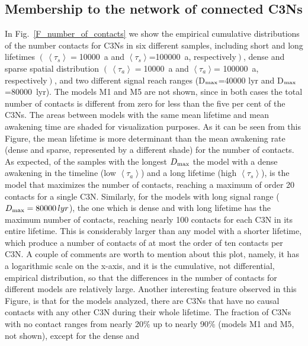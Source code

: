 \documentclass[crop]{CSLB}
\newcommand{\ceti}{C3N}
\newcommand{\cetis}{C3Ns}
\newcommand{\ffn}[1]{}
\begin{document}


\subsection{Membership to the network of connected \cetis{}}\label{SS_members}

\ffn{3}
%
In Fig.~\ref{F_number_of_contacts} we show the empirical cumulative
distributions of the number contacts for \cetis{} in six different
samples, including short and long lifetimes
$\left(\,\left<\tau_s\right>=\right.$10000~a and
$\left<\tau_s\right>$=100000~a, respectively$\left.\right)$, dense
and sparse spatial distribution
$\left(\,\left<\tau_a\right>=\right.$10000~a and
$\left<\tau_a\right>$= 100000~a, respectively$\left.\right)$, and two
different signal reach ranges (D$_{\rm max}$=40000 lyr and
D$_{\rm max}$=80000~lyr).
%
The models M1 and M5 are not shown, since in both cases the total
number of contacts is different from zero for less than the five per
cent of the \cetis{}.
%
The areas between models with the same mean lifetime and mean
awakening time are shaded for visualization purposes.
%
As it can be seen from this Figure, the mean lifetime is more
determinant than the mean awakening rate (dense and sparse,
represented by a different shade) for the number of contacts.
%
As expected, of the samples with the longest $D_{\rm max}$ the model with
a dense awakening in the timeline (low $\left<\tau_a\right>$) and a
long lifetime (high $\left<\tau_s\right>$), is the model that
maximizes the number of contacts, reaching a maximum of order 20
contacts for a single \ceti{}.
%
Similarly, for the models with long signal range
($D_{\rm max}=80000\,lyr$), the one which is dense and with long lifetime
has the maximum number of contacts, reaching nearly 100 contacts for
each \ceti{} in its entire lifetime.
%
This is considerably larger than any model with a shorter lifetime,
which produce a number of contacts of at most the order of ten
contacts per \ceti{}.
%
A couple of comments are worth to mention about this plot, namely, it
has a logarithmic scale on the x-axis, and it is the cumulative, not
differential, empirical distribution, so that the differences in the
number of contacts for different models are relatively large.
%
Another interesting feature observed in this Figure, is that for the
models analyzed, there are \cetis{} that have no causal contacts with
any other \ceti{} during their whole lifetime.
%
The fraction of \cetis{} with no contact ranges from nearly 20\% up to
nearly 90\% (models M1 and M5, not shown), except for the dense and
\end{document}
